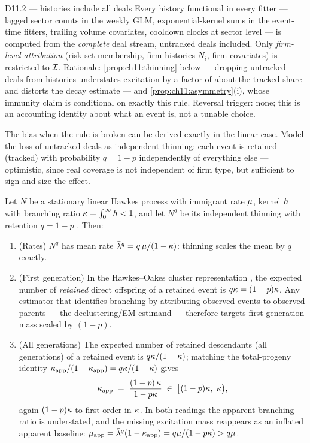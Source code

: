 \begin{decision}{D11.2 --- histories include all deals}
Every history functional in every fitter --- lagged sector counts in the
weekly GLM, exponential-kernel sums in the event-time fitters, trailing
volume covariates, cooldown clocks at sector level --- is computed from
the \emph{complete} deal stream, untracked deals included. Only
\emph{firm-level attribution} (risk-set membership, firm histories
$N_i$, firm covariates) is restricted to $\mathcal{I}$. Rationale:
\cref{prop:ch11:thinning} below --- dropping untracked deals from
histories understates excitation by a factor of about the tracked share
and distorts the decay estimate --- and \cref{prop:ch11:asymmetry}(i),
whose immunity claim is conditional on exactly this rule. Reversal
trigger: none; this is an accounting identity about what an event is, not
a tunable choice.
\end{decision}

The bias when the rule is broken can be derived exactly in the linear
case. Model the loss of untracked deals as independent thinning: each
event is retained (tracked) with probability $q = 1-p$ independently of
everything else --- optimistic, since real coverage is not independent of
firm type, but sufficient to sign and size the effect.

\begin{proposition}\label{prop:ch11:thinning}
Let $N$ be a stationary linear Hawkes process with immigrant rate
$\mu$, kernel $h$ with branching ratio
$\kappa = \int_0^\infty h < 1$, and let $N^{q}$ be its
independent thinning with retention $q = 1-p$
\citep[Ch.~11]{daley2003}. Then:
\begin{enumerate}[label=(\roman*)]
\item (Rates) $N^q$ has mean rate
$\bar{\lambda}^{q} = q\,\mu/(1-\kappa)$: thinning scales the mean by $q$
exactly.
\item (First generation) In the Hawkes--Oakes cluster representation
\citep{hawkesoakes1974}, the expected number of \emph{retained} direct
offspring of a retained event is $q\kappa = (1-p)\kappa$. Any
estimator that identifies branching by attributing observed events to
observed parents --- the declustering/EM estimand
\citep{veenschoenberg2008} --- therefore targets first-generation mass
scaled by $(1-p)$.
\item (All generations) The expected number of retained descendants (all
generations) of a retained event is $q\kappa/(1-\kappa)$; matching the
total-progeny identity $\kappa_{\mathrm{app}}/(1-\kappa_{\mathrm{app}})
= q\kappa/(1-\kappa)$ gives
\begin{equation}\label{eq:ch11:kappaapp}
\kappa_{\mathrm{app}} \;=\; \frac{(1-p)\,\kappa}{1 - p\kappa}
 \;\in\; \big[(1-p)\kappa,\ \kappa\big),
\end{equation}
again $(1-p)\kappa$ to first order in $\kappa$. In both readings the
apparent branching ratio is understated, and the missing excitation mass
reappears as an inflated apparent baseline:
$\mu_{\mathrm{app}} = \bar{\lambda}^{q}(1-\kappa_{\mathrm{app}})
= q\mu/(1-p\kappa) > q\mu$.
\end{enumerate}
\end{proposition}

